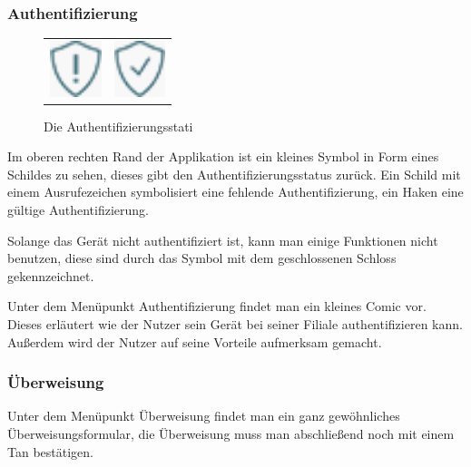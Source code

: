 \subsubsection{Authentifizierung}
\begin{figure}[h]
    \centering
	\begin{tabular}{@{}cc@{}}
        	\includegraphics[width=1.5cm]{Pictures/notauth} &
    		\includegraphics[width=1.5cm]{Pictures/authed}
    \end{tabular}
	\caption{Die Authentifizierungsstati\label{fig4}}
\end{figure}

	Im oberen rechten Rand der Applikation ist ein kleines Symbol in Form eines Schildes zu sehen, dieses gibt den Authentifizierungsstatus zurück. Ein Schild mit einem Ausrufezeichen symbolisiert eine fehlende Authentifizierung, ein Haken eine gültige Authentifizierung.

	Solange das Gerät nicht authentifiziert ist, kann man einige Funktionen nicht benutzen, diese sind durch das Symbol mit dem geschlossenen Schloss gekennzeichnet.

	Unter dem Menüpunkt Authentifizierung findet man ein kleines Comic vor. Dieses erläutert wie der Nutzer sein Gerät bei seiner Filiale authentifizieren kann. Außerdem wird der Nutzer auf seine Vorteile aufmerksam gemacht.

\subsubsection{Überweisung}
	Unter dem Menüpunkt Überweisung findet man ein ganz gewöhnliches Überweisungsformular, die Überweisung muss man abschließend noch mit einem Tan bestätigen.

